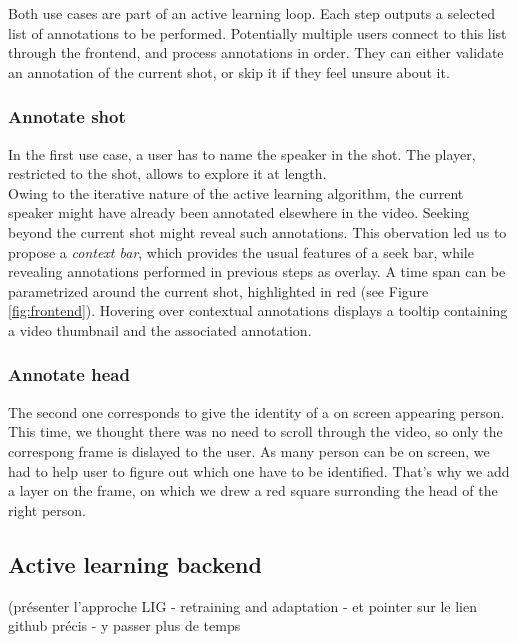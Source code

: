 \documentclass[a4paper]{article}
\begin{document}
Both use cases are part of an active learning loop. Each step outputs a selected list of annotations to be performed. Potentially multiple users connect to this list through the frontend, and process annotations in order. They can either validate an annotation of the current shot, or skip it if they feel unsure about it.


\subsubsection{Annotate shot} \label{sec:shot}
In the first use case, a user has to name the speaker in the shot. The player, restricted to the shot, allows to explore it at length.\\
Owing to the iterative nature of the active learning algorithm, the current speaker might have already been annotated elsewhere in the video. Seeking beyond the current shot might reveal such annotations. This obervation led us to propose a \emph{context bar}, which provides the usual features of a seek bar, while revealing annotations performed in previous steps as overlay. A time span can be parametrized around the current shot, highlighted in red (see Figure \ref{fig:frontend}). Hovering over contextual annotations displays a tooltip containing a video thumbnail and the associated annotation.\\

\subsubsection{Annotate head} \label{sec:head}
The second one corresponds to give the identity of a on screen appearing person. This time, we thought there was no need to scroll through the video, so only the correspong frame is dislayed to the user. As many person can be on screen, we had to help user to figure out which one have to be identified. That's why we add a layer on the frame, on which we drew a red square surronding the head of the right person.\\



      \subsection{Active learning backend}
(présenter l'approche LIG - retraining and adaptation - et pointer sur le lien github précis - y passer plus de temps 
\end{document}

